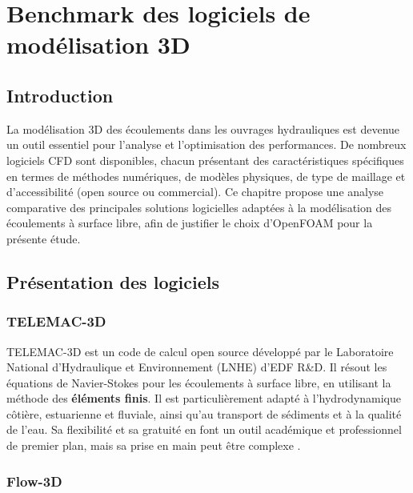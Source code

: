 \chapter{Benchmark des logiciels de modélisation 3D}
\label{chap:benchmark_logiciels}

\section{Introduction}
\label{sec:introduction_benchmark}

La modélisation 3D des écoulements dans les ouvrages hydrauliques est devenue un outil essentiel pour l'analyse et l'optimisation des performances. De nombreux logiciels CFD sont disponibles, chacun présentant des caractéristiques spécifiques en termes de méthodes numériques, de modèles physiques, de type de maillage et d'accessibilité (open source ou commercial). Ce chapitre propose une analyse comparative des principales solutions logicielles adaptées à la modélisation des écoulements à surface libre, afin de justifier le choix d'OpenFOAM pour la présente étude.

\section{Présentation des logiciels}
\label{sec:presentation_logiciels}

\subsection{TELEMAC-3D}
\label{subsec:telemac}

TELEMAC-3D est un code de calcul open source développé par le Laboratoire National d'Hydraulique et Environnement (LNHE) d'EDF R\&D. Il résout les équations de Navier-Stokes pour les écoulements à surface libre, en utilisant la méthode des \textbf{éléments finis}. Il est particulièrement adapté à l'hydrodynamique côtière, estuarienne et fluviale, ainsi qu'au transport de sédiments et à la qualité de l'eau. Sa flexibilité et sa gratuité en font un outil académique et professionnel de premier plan, mais sa prise en main peut être complexe \cite{galland1991telemac, hervouet2007hydrodynamics}.

\subsection{Flow-3D}
\label{subsec:flow3d}

